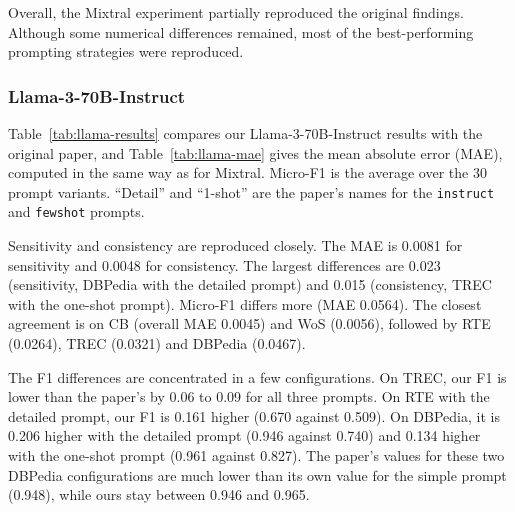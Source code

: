 \par\medskip

Overall, the Mixtral experiment partially
reproduced the original findings. Although
some numerical differences remained, most
of the best-performing prompting strategies
were reproduced.


\subsubsection{Llama-3-70B-Instruct}

Table~\ref{tab:llama-results} compares our Llama-3-70B-Instruct results with the original paper, and Table~\ref{tab:llama-mae} gives the mean absolute error (MAE), computed in the same way as for Mixtral. Micro-F1 is the average over the 30 prompt variants. ``Detail'' and ``1-shot'' are the paper's names for the \texttt{instruct} and \texttt{fewshot} prompts.

Sensitivity and consistency are reproduced closely. The MAE is 0.0081 for
sensitivity and 0.0048 for consistency. The largest differences are 0.023
(sensitivity, DBPedia with the detailed prompt) and 0.015 (consistency, TREC with the one-shot prompt). Micro-F1 differs more (MAE 0.0564). The closest agreement is on CB (overall MAE 0.0045) and WoS (0.0056), followed by RTE (0.0264), TREC (0.0321) and DBPedia (0.0467).

The F1 differences are concentrated in a few configurations. On TREC, our F1 is lower than the paper's by 0.06 to 0.09 for all three prompts. On RTE with the detailed prompt, our F1 is 0.161 higher (0.670 against 0.509). On DBPedia, it is 0.206 higher with the detailed prompt (0.946 against 0.740) and 0.134 higher with the one-shot prompt (0.961 against 0.827). The paper's values for these two DBPedia configurations are much lower than its own value for the simple prompt (0.948), while ours stay between 0.946 and 0.965.

